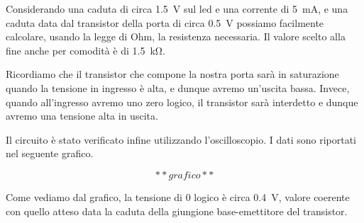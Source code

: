 Considerando una caduta di circa \SI{1.5}{\volt} sul led e una corrente di \SI{5}{\milli\ampere}, e una caduta data dal transistor della porta di circa \SI{0.5}{\volt} possiamo facilmente calcolare, usando la legge di Ohm, la resistenza necessaria. Il valore scelto alla fine anche per comodità è di \SI{1.5}{\kilo\ohm}.

Ricordiamo che il transistor che compone la nostra porta sarà in saturazione quando la tensione in ingresso è alta, e dunque avremo un'uscita bassa. Invece, quando all'ingresso avremo uno zero logico, il transistor sarà interdetto e dunque avremo una tensione alta in uscita. 

Il circuito è stato verificato infine utilizzando l'oscilloscopio. I dati sono riportati nel seguente grafico. 

$$**grafico**$$

Come vediamo dal grafico, la tensione di 0 logico è circa \SI{0.4}{\volt}, valore coerente con quello atteso data la caduta della giungione base-emettitore del transistor.




